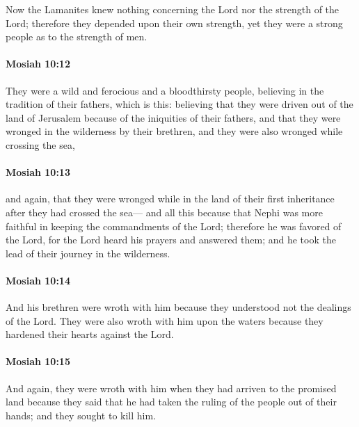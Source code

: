 			Now the Lamanites knew nothing concerning the Lord nor the strength of the Lord;
			therefore they depended upon their own strength,
			yet they were a strong people as to the strength of men.

		\paragraph{Mosiah 10:12} %
			\label{MOSIAH-10-12}

			They were a wild and ferocious and a bloodthirsty people,
			believing in the tradition of their fathers, which is this:
			believing that they were driven out of the land of Jerusalem
			because of the iniquities of their fathers,
			and that they were wronged in the wilderness by their brethren,
			and they were also wronged while crossing the sea,

		\paragraph{Mosiah 10:13} %
			\label{MOSIAH-10-13}

			and again, that they were wronged while in the land of their first inheritance
			after they had crossed the sea---
			and all this because that Nephi was more faithful
			in keeping the commandments of the Lord;
			therefore he was favored of the Lord,
			for the Lord heard his prayers and answered them;
			and he took the lead of their journey in the wilderness.

		\paragraph{Mosiah 10:14} %
			\label{MOSIAH-10-14}

			And his brethren were wroth with him
			because they understood not the dealings of the Lord.
			They were also wroth with him upon the waters
			because they hardened their hearts against the Lord.

		\paragraph{Mosiah 10:15} %
			\label{MOSIAH-10-15}

			And again, they were wroth with him when they had arriven to the promised land
			because they said that he had taken the ruling of the people out of their hands;
			and they sought to kill him.


